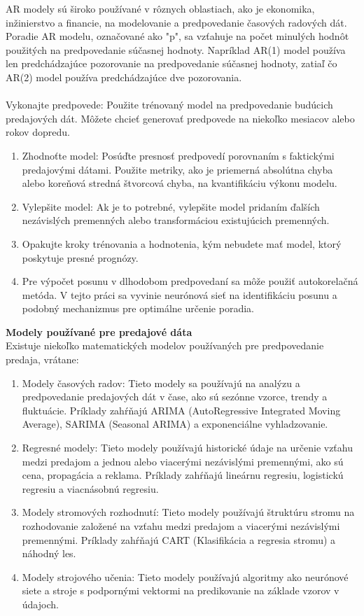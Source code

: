     AR modely sú široko používané v rôznych oblastiach, ako je ekonomika, inžinierstvo a financie, na modelovanie a predpovedanie časových radových dát.
    Poradie AR modelu, označované ako "p", sa vzťahuje na počet minulých hodnôt použitých na predpovedanie súčasnej hodnoty.
    Napríklad AR(1) model používa len predchádzajúce pozorovanie na predpovedanie súčasnej hodnoty, zatiaľ čo AR(2) model používa predchádzajúce
    dve pozorovania.\\
    \\
    Vykonajte predpovede: Použite trénovaný model na predpovedanie budúcich predajových dát. Môžete chcieť generovať predpovede na niekoľko
    mesiacov alebo rokov dopredu.
    \begin{enumerate}
        \item Zhodnoťte model: Posúďte presnosť predpovedí porovnaním s faktickými predajovými dátami. Použite metriky, ako je priemerná absolútna
        chyba alebo koreňová stredná štvorcová chyba, na kvantifikáciu výkonu modelu.
        \item Vylepšite model: Ak je to potrebné, vylepšite model pridaním ďalších nezávislých premenných alebo transformáciou existujúcich premenných.
        \item Opakujte kroky trénovania a hodnotenia, kým nebudete mať model, ktorý poskytuje presné prognózy.
        \item Pre výpočet posunu v dlhodobom predpovedaní sa môže použiť autokorelačná metóda. V tejto práci sa vyvinie neurónová sieť na identifikáciu
        posunu a podobný mechanizmus pre optimálne určenie poradia.
    \end{enumerate}
    \textbf{Modely používané pre predajové dáta} \\
    Existuje niekoľko matematických modelov používaných pre predpovedanie predaja, vrátane:\\
    \begin{enumerate}
        \item Modely časových radov: Tieto modely sa používajú na analýzu a predpovedanie predajových dát v čase, ako sú sezónne vzorce,
        trendy a fluktuácie. Príklady zahŕňajú ARIMA (AutoRegressive Integrated Moving Average), SARIMA (Seasonal ARIMA) a exponenciálne vyhladzovanie.
        \item Regresné modely: Tieto modely používajú historické údaje na určenie vzťahu medzi predajom a jednou alebo viacerými
        nezávislými premennými, ako sú cena, propagácia a reklama. Príklady zahŕňajú lineárnu regresiu, logistickú regresiu a viacnásobnú regresiu.
        \item Modely stromových rozhodnutí: Tieto modely používajú štruktúru stromu na rozhodovanie založené na vzťahu medzi
        predajom a viacerými nezávislými premennými. Príklady zahŕňajú CART (Klasifikácia a regresia stromu) a náhodný les.
        \item Modely strojového učenia: Tieto modely používajú algoritmy ako neurónové siete a stroje s podpornými
        vektormi na predikovanie na základe vzorov v údajoch.
    \end{enumerate}
